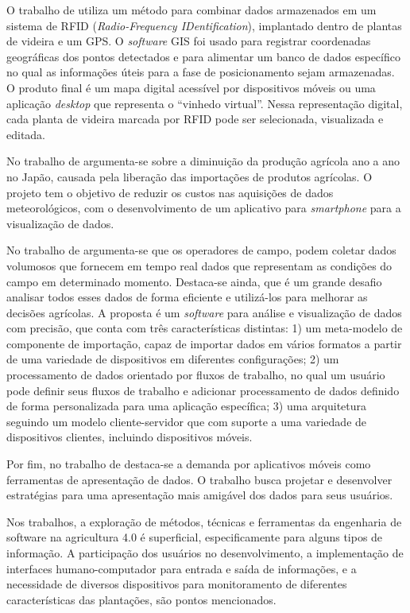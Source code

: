 \documentclass[12pt]{article}
\begin{document}
O trabalho de  utiliza um método para combinar dados armazenados em um sistema de RFID (\textit{Radio-Frequency IDentification}), implantado dentro de plantas de videira e um GPS. O \textit{software} GIS foi usado para registrar coordenadas geográficas dos pontos detectados e para alimentar um banco de dados específico no qual as informações úteis para a fase de posicionamento sejam armazenadas. O produto final é um mapa digital acessível por dispositivos móveis ou uma aplicação \textit{desktop} que representa o ``vinhedo virtual''. Nessa representação digital, cada planta de videira marcada por RFID pode ser selecionada, visualizada e editada.

No trabalho de  argumenta-se sobre a diminuição da produção agrícola ano a ano no Japão, causada pela liberação das importações de produtos agrícolas. O projeto tem o objetivo de reduzir os custos nas aquisições de dados meteorológicos, com o desenvolvimento de um aplicativo para \textit{smartphone} para a visualização de dados.

No trabalho de  argumenta-se que os operadores de campo, podem coletar dados volumosos que fornecem em tempo real dados que representam as condições do campo em determinado momento. Destaca-se ainda, que é um grande desafio analisar todos esses dados de forma eficiente e utilizá-los para melhorar as decisões agrícolas. A proposta é um \textit{software} para análise e visualização de dados com precisão, que conta com três características distintas: 1) um meta-modelo de componente de importação, capaz de importar dados em vários formatos a partir de uma variedade de dispositivos em diferentes configurações; 2) um processamento de dados orientado por fluxos de trabalho, no qual um usuário pode definir seus fluxos de trabalho e adicionar processamento de dados definido de forma personalizada para uma aplicação específica; 3) uma arquitetura seguindo um modelo cliente-servidor que com suporte a uma variedade de dispositivos clientes, incluindo dispositivos móveis.

Por fim, no trabalho de  destaca-se a demanda por aplicativos móveis como ferramentas de apresentação de dados. O trabalho busca projetar e desenvolver estratégias para uma apresentação mais amigável dos dados para seus usuários. 

Nos trabalhos, a exploração de métodos, técnicas e ferramentas da engenharia de software na agricultura 4.0 é superficial, especificamente para alguns tipos de informação. A participação dos usuários no desenvolvimento, a implementação de interfaces humano-computador para entrada e saída de informações, e a necessidade de diversos dispositivos para monitoramento de diferentes características das plantações, são pontos mencionados.
\end{document}
